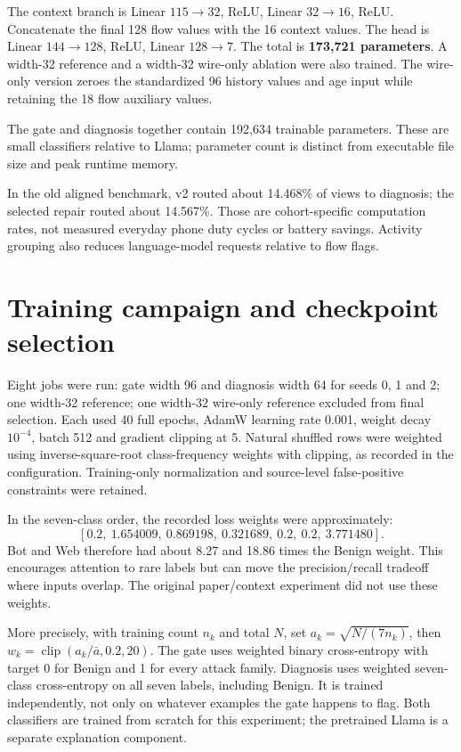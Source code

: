 \documentclass[11pt,a4paper,oneside]{report}
\begin{document}
The context branch is Linear $115\to32$, ReLU, Linear $32\to16$, ReLU. Concatenate the final 128 flow values with the 16 context values. The head is Linear $144\to128$, ReLU, Linear $128\to7$. The total is \textbf{173,721 parameters}. A width-32 reference and a width-32 wire-only ablation were also trained. The wire-only version zeroes the standardized 96 history values and age input while retaining the 18 flow auxiliary values.

The gate and diagnosis together contain 192,634 trainable parameters. These are small classifiers relative to Llama; parameter count is distinct from executable file size and peak runtime memory.

In the old aligned benchmark, v2 routed about 14.468\% of views to diagnosis; the selected repair routed about 14.567\%. Those are cohort-specific computation rates, not measured everyday phone duty cycles or battery savings. Activity grouping also reduces language-model requests relative to flow flags.

\section{Training campaign and checkpoint selection}
Eight jobs were run: gate width 96 and diagnosis width 64 for seeds 0, 1 and 2; one width-32 reference; one width-32 wire-only reference excluded from final selection. Each used 40 full epochs, AdamW learning rate 0.001, weight decay $10^{-4}$, batch 512 and gradient clipping at 5. Natural shuffled rows were weighted using inverse-square-root class-frequency weights with clipping, as recorded in the configuration. Training-only normalization and source-level false-positive constraints were retained.

In the seven-class order, the recorded loss weights were approximately:
\[ [0.2,\ 1.654009,\ 0.869198,\ 0.321689,\ 0.2,\ 0.2,\ 3.771480]. \]
Bot and Web therefore had about 8.27 and 18.86 times the Benign weight. This encourages attention to rare labels but can move the precision/recall tradeoff where inputs overlap. The original paper/context experiment did not use these weights.

More precisely, with training count $n_k$ and total $N$, set $a_k=\sqrt{N/(7n_k)}$, then $w_k=\operatorname{clip}(a_k/\bar a,0.2,20)$. The gate uses weighted binary cross-entropy with target 0 for Benign and 1 for every attack family. Diagnosis uses weighted seven-class cross-entropy on all seven labels, including Benign. It is trained independently, not only on whatever examples the gate happens to flag. Both classifiers are trained from scratch for this experiment; the pretrained Llama is a separate explanation component.
\end{document}
